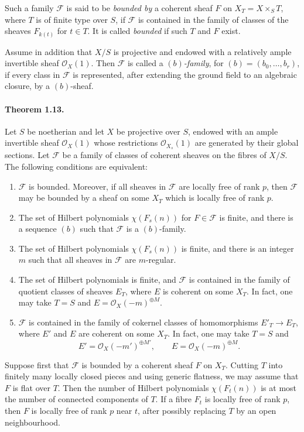 \documentclass[12pt]{article}
\newcommand{\cO}{\mathcal O}
\begin{document}
Such a family $\mathscr F$ is said to be \emph{bounded by} a coherent sheaf $F$ on $X_T=X\times_ST$, where $T$ is of finite type over $S$, if $\mathscr F$ is contained in the family of classes of the sheaves $F_{k(t)}$ for $t\in T$. It is called \emph{bounded} if such $T$ and $F$ exist.

Assume in addition that $X/S$ is projective and endowed with a relatively ample invertible sheaf $\cO_X(1)$. Then $\mathscr F$ is called a \emph{$(b)$-family}, for $(b)=(b_0,\ldots,b_r)$, if every class in $\mathscr F$ is represented, after extending the ground field to an algebraic closure, by a $(b)$-sheaf.

\paragraph{Theorem 1.13.}
Let $S$ be noetherian and let $X$ be projective over $S$, endowed with an ample invertible sheaf $\cO_X(1)$ whose restrictions $\cO_{X_s}(1)$ are generated by their global sections. Let $\mathscr F$ be a family of classes of coherent sheaves on the fibres of $X/S$. The following conditions are equivalent:
\begin{enumerate}[label=\roman*)]
\item $\mathscr F$ is bounded. Moreover, if all sheaves in $\mathscr F$ are locally free of rank $p$, then $\mathscr F$ may be bounded by a sheaf on some $X_T$ which is locally free of rank $p$.
\item The set of Hilbert polynomials $\chi(F_s(n))$ for $F\in\mathscr F$ is finite, and there is a sequence $(b)$ such that $\mathscr F$ is a $(b)$-family.
\item The set of Hilbert polynomials $\chi(F_s(n))$ is finite, and there is an integer $m$ such that all sheaves in $\mathscr F$ are $m$-regular.
\item The set of Hilbert polynomials is finite, and $\mathscr F$ is contained in the family of quotient classes of sheaves $E_T$, where $E$ is coherent on some $X_T$. In fact, one may take $T=S$ and $E=\cO_X(-m)^{\oplus M}$.
\item $\mathscr F$ is contained in the family of cokernel classes of homomorphisms $E'_T\to E_T$, where $E'$ and $E$ are coherent on some $X_T$. In fact, one may take $T=S$ and
\[
E'=\cO_X(-m')^{\oplus M'},\qquad E=\cO_X(-m)^{\oplus M}.
\]
\end{enumerate}

Suppose first that $\mathscr F$ is bounded by a coherent sheaf $F$ on $X_T$. Cutting $T$ into finitely many locally closed pieces and using generic flatness, we may assume that $F$ is flat over $T$. Then the number of Hilbert polynomials $\chi(F_t(n))$ is at most the number of connected components of $T$. If a fibre $F_t$ is locally free of rank $p$, then $F$ is locally free of rank $p$ near $t$, after possibly replacing $T$ by an open neighbourhood.
\end{document}
